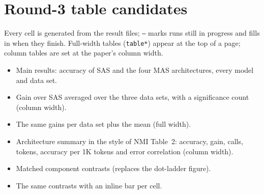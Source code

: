 \documentclass[10pt,twocolumn,letterpaper]{article}
\begin{document}
\section*{Round-3 table candidates}
Every cell is generated from the result files; \texttt{--} marks runs still in progress and fills in
when they finish. Full-width tables (\texttt{table*}) appear at the top of a page; column tables
are set at the paper's column width.
\begin{itemize}\itemsep0pt
\item[T1a] Main results: accuracy of SAS and the four MAS architectures, every model and data set.
\item[T1b] Gain over SAS averaged over the three data sets, with a significance count (column width).
\item[T1b-wide] The same gains per data set plus the mean (full width).
\item[T1c] Architecture summary in the style of NMI Table~2: accuracy, gain, calls, tokens,
accuracy per 1K tokens and error correlation (column width).
\item[T2a] Matched component contrasts (replaces the dot-ladder figure).
\item[T2b] The same contrasts with an inline bar per cell.
\end{itemize}

\end{document}
